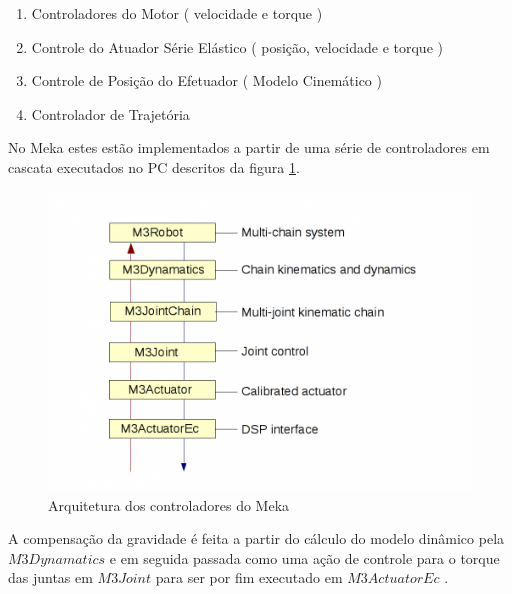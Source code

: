 \begin{enumerate}
    \item Controladores do Motor ( velocidade e torque )
    \item Controle do Atuador Série Elástico ( posição, velocidade e torque )
    \item Controle de Posição do Efetuador ( Modelo Cinemático )
    \item Controlador de Trajetória
\end{enumerate}

No Meka estes estão implementados a partir de uma série de controladores em cascata executados no PC descritos da figura \ref{fig:controlarch}.

\begin{figure}[H]
    \centering
    \includegraphics[width=0.7\linewidth]{tex/figs/controlarch.png}
    \caption{Arquitetura dos controladores do Meka \cite{mekaguide}}
    \label{fig:controlarch}
\end{figure}

A compensação da gravidade é feita a partir do cálculo do modelo dinâmico pela $M3Dynamatics$ e em seguida passada como uma ação de controle para o torque das juntas em $M3Joint$ para ser por fim executado em $M3ActuatorEc$ \cite{mekaguide}.




